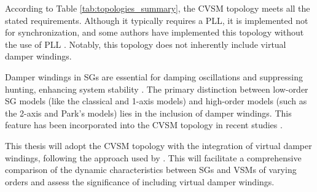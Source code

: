 According to Table \ref{tab:topologies_summary}, the CVSM topology meets all the
stated requirements. Although it typically requires a PLL, it is implemented not
for synchronization, and some authors have implemented this topology without the
use of PLL \cite{tayyebi2020power}. Notably, this topology does not inherently
include virtual damper windings.

Damper windings in SGs are essential for damping oscillations and suppressing
hunting, enhancing system stability \cite{sauer2017power,kundur2022power}. The
primary distinction between low-order SG models (like the classical and 1-axis
models) and high-order models (such as the 2-axis and Park's models) lies in the
inclusion of damper windings. This feature has been incorporated into the CVSM
topology in recent studies \cite{zhang2013vsm,ma2017vsg}.

This thesis will adopt the CVSM topology with the integration of virtual damper
windings, following the approach used by \cite{zhang2013vsm, ma2017vsg}. This
will facilitate a comprehensive comparison of the dynamic characteristics
between SGs and VSMs of varying orders and assess the significance of including
virtual damper windings.